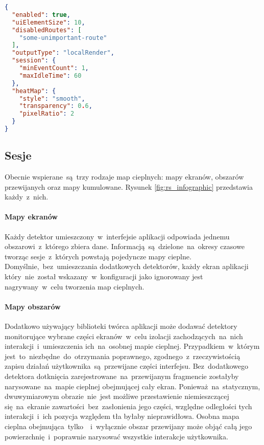\begin{lstlisting}[language=json,caption={Przykładowy plik konfiguracyjny~w~formacie json},label=lst:rs_config_json]
{
  "enabled": true,
  "uiElementSize": 10,
  "disabledRoutes": [
    "some-unimportant-route"
  ],
  "outputType": "localRender",
  "session": {
    "minEventCount": 1,
    "maxIdleTime": 60
  },
  "heatMap": {
    "style": "smooth",
    "transparency": 0.6,
    "pixelRatio": 2
  }
}
\end{lstlisting}

\subsection{Sesje}
Obecnie wspierane~są~trzy rodzaje map cieplnych: mapy ekranów, obszarów przewijanych oraz mapy kumulowane. Rysunek \ref{fig:rs_infographic} przedstawia każdy~z~nich.


\paragraph{Mapy ekranów} Każdy detektor umieszczony~w~interfejsie aplikacji odpowiada jednemu obszarowi~z~którego zbiera dane. Informacją~są~dzielone~na~okresy czasowe tworząc sesje~z~których powstają pojedyncze mapy cieplne. Domyślnie,~bez~umieszczania dodatkowych detektorów, każdy ekran aplikacji który~nie~został wskazany~w~konfiguracji jako ignorowany jest nagrywany~w~celu tworzenia map cieplnych.


\paragraph{Mapy obszarów} Dodatkowo używający biblioteki twórca aplikacji może dodawać detektory monitorujące wybrane części ekranów~w~celu izolacji zachodzących~na~nich interakcji~i~umieszczenia ich~na~osobnej mapie cieplnej. Przypadkiem~w~którym jest~to~niezbędne~do~otrzymania poprawnego, zgodnego~z~rzeczywistością zapisu działań użytkownika~są~przewijane części interfejsu. Bez~dodatkowego detektora dotknięcia zarejestrowane~na~przewijanym fragmencie zostałyby narysowane~na~mapie cieplnej obejmującej cały ekran. Ponieważ~na~statycznym, dwuwymiarowym obrazie~nie~jest możliwe przestawienie niemieszczącej się~na~ekranie zawartości~bez~zasłonienia jego części, względne odległości tych interakcji~i~ich pozycja względem tła byłaby nieprawidłowa. Osobna mapa cieplna obejmująca~tylko~~i~wyłącznie obszar przewijany może objąć całą jego powierzchnię~i~poprawnie narysować wszystkie interakcje użytkownika.

